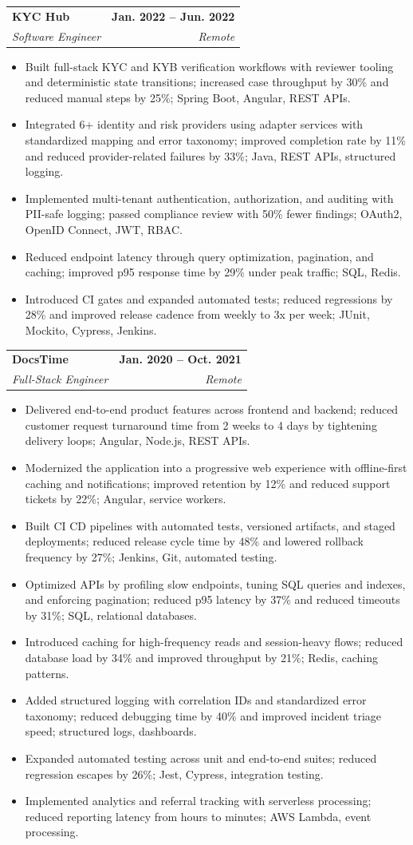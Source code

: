 \documentclass[letterpaper,10pt]{article}
\makeatletter
\newcommand{\resumeItem}[1]{\item\small{#1 \vspace{-2pt}}}
\newcommand{\resumeSubheading}[4]{
  \vspace{-2pt}\item
    \begin{tabular*}{1.0\textwidth}[t]{l@{\extracolsep{\fill}}r}
      \textbf{#1} & \textbf{\small #2} \\
      \textit{\small #3} & \textit{\small #4} \\
    \end{tabular*}\vspace{-7pt}
}
\newcommand{\resumeItemListStart}{\begin{itemize}[leftmargin=0.15in]\setlength\itemsep{2pt}}
\newcommand{\resumeItemListEnd}{\end{itemize}\vspace{-5pt}}
\makeatother
\begin{document}
  \resumeSubheading
    {KYC Hub}{Jan. 2022 -- Jun. 2022}
    {Software Engineer}{Remote}
    \resumeItemListStart
      \resumeItem{Built full-stack KYC and KYB verification workflows with reviewer tooling and deterministic state transitions; increased case throughput by 30\% and reduced manual steps by 25\%; Spring Boot, Angular, REST APIs.}
      \resumeItem{Integrated 6+ identity and risk providers using adapter services with standardized mapping and error taxonomy; improved completion rate by 11\% and reduced provider-related failures by 33\%; Java, REST APIs, structured logging.}
      \resumeItem{Implemented multi-tenant authentication, authorization, and auditing with PII-safe logging; passed compliance review with 50\% fewer findings; OAuth2, OpenID Connect, JWT, RBAC.}
      \resumeItem{Reduced endpoint latency through query optimization, pagination, and caching; improved p95 response time by 29\% under peak traffic; SQL, Redis.}
      \resumeItem{Introduced CI gates and expanded automated tests; reduced regressions by 28\% and improved release cadence from weekly to 3x per week; JUnit, Mockito, Cypress, Jenkins.}
    \resumeItemListEnd

  \resumeSubheading
    {DocsTime}{Jan. 2020 -- Oct. 2021}
    {Full-Stack Engineer}{Remote}
    \resumeItemListStart
      \resumeItem{Delivered end-to-end product features across frontend and backend; reduced customer request turnaround time from 2 weeks to 4 days by tightening delivery loops; Angular, Node.js, REST APIs.}
      \resumeItem{Modernized the application into a progressive web experience with offline-first caching and notifications; improved retention by 12\% and reduced support tickets by 22\%; Angular, service workers.}
      \resumeItem{Built CI CD pipelines with automated tests, versioned artifacts, and staged deployments; reduced release cycle time by 48\% and lowered rollback frequency by 27\%; Jenkins, Git, automated testing.}
      \resumeItem{Optimized APIs by profiling slow endpoints, tuning SQL queries and indexes, and enforcing pagination; reduced p95 latency by 37\% and reduced timeouts by 31\%; SQL, relational databases.}
      \resumeItem{Introduced caching for high-frequency reads and session-heavy flows; reduced database load by 34\% and improved throughput by 21\%; Redis, caching patterns.}
      \resumeItem{Added structured logging with correlation IDs and standardized error taxonomy; reduced debugging time by 40\% and improved incident triage speed; structured logs, dashboards.}
      \resumeItem{Expanded automated testing across unit and end-to-end suites; reduced regression escapes by 26\%; Jest, Cypress, integration testing.}
      \resumeItem{Implemented analytics and referral tracking with serverless processing; reduced reporting latency from hours to minutes; AWS Lambda, event processing.}
    \resumeItemListEnd
\end{document}
